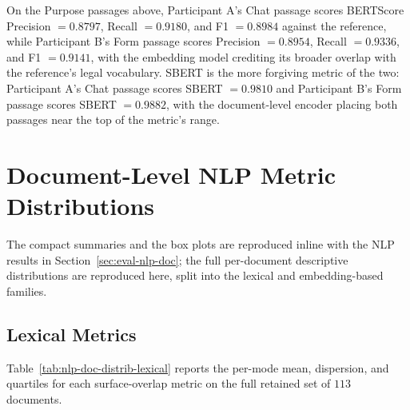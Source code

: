 On the Purpose passages above, Participant A's Chat passage
scores BERTScore Precision $= 0.8797$, Recall $= 0.9180$, and F1
$= 0.8984$ against the reference, while Participant B's Form
passage scores Precision $= 0.8954$, Recall $= 0.9336$, and F1
$= 0.9141$, with the embedding model crediting its broader
overlap with the reference's legal vocabulary. SBERT is the more
forgiving metric of the two: Participant A's Chat passage scores
SBERT $= 0.9810$ and Participant B's Form passage scores SBERT
$= 0.9882$, with the document-level encoder placing both
passages near the top of the metric's range.


\section{Document-Level NLP Metric Distributions}
\label{app:items-nlp-doc}

The compact summaries and the box plots are reproduced inline with
the NLP results in Section~\ref{sec:eval-nlp-doc}; the full
per-document descriptive distributions are reproduced here, split
into the lexical and embedding-based families.

\subsection{Lexical Metrics}
\label{app:items-nlp-doc-lexical}

Table~\ref{tab:nlp-doc-distrib-lexical} reports the per-mode mean,
dispersion, and quartiles for each surface-overlap metric on the
full retained set of $113$ documents.

